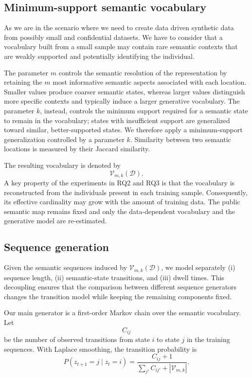 \documentclass[sigconf,nonacm]{acmart}
\begin{document}
\subsection{Minimum-support semantic vocabulary}
\label{sec:vocabulary}

As we are in the scenario where we need to create data driven synthetic data from possibly small  and confidential datasets.  We have to consider that a vocabulary built from a small sample may contain rare semantic contexts that are weakly supported and potentially identifying the individual.

The parameter $m$ controls the semantic resolution of the representation by retaining the $m$ most informative semantic aspects associated with each location. Smaller values produce coarser semantic states, whereas larger values distinguish more specific contexts and typically induce a larger generative vocabulary.
The parameter $k$, instead, controls the minimum support required for a semantic state to remain in the vocabulary; states with insufficient support are generalized toward similar, better-supported states.
We therefore apply a minimum-support generalization controlled by a parameter $k$.
Similarity between two semantic locations is measured by
their Jaccard similarity.


The resulting vocabulary is denoted by
%
\[
    \mathcal{V}_{m,k}(\mathcal{D}).
\]
%
A key property of the experiments in RQ2 and RQ3 is that the vocabulary is reconstructed from the individuals present in each training sample.
Consequently, its effective cardinality may grow with the amount of training data. The public semantic map remains fixed and only the data-dependent vocabulary and the generative model are re-estimated.


\subsection{Sequence generation}
\label{sec:generation}

Given the semantic sequences induced by
$\mathcal{V}_{m,k}(\mathcal{D})$, we model separately
(i) sequence length, (ii) semantic-state transitions, and (iii) dwell times. This decoupling ensures that the comparison between different sequence generators changes the transition model while keeping the remaining components fixed.

Our main generator is a first-order Markov chain over the semantic vocabulary. Let
%
\[
    C_{ij}
\]
%
be the number of observed transitions from state $i$ to state $j$ in the training sequences. With Laplace smoothing, the transition probability is
%
\[
    P(z_{t+1}=j \mid z_t=i)
    =
    \frac{C_{ij}+1}
         {\sum_{j'} C_{ij'} + |\mathcal{V}_{m,k}|}.
\]
\end{document}
